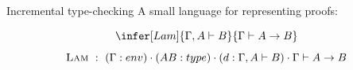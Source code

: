 \documentclass[ignorenonframetext,red]{beamer}
\begin{document}
\begin{frame}{Incremental type-checking}
  A small language for representing proofs:
  \begin{example}
    \[ \infer[Lam]{\Gamma,A\vdash B}{\Gamma\vdash A\to B} \]
    \[ \textsc{Lam}\ :\ (\Gamma : env)\cdot(A B : type)\cdot
    (d : \Gamma,A\vdash B)\cdot \Gamma\vdash A\to B \]
  \end{example}
\end{frame}
\end{document}
